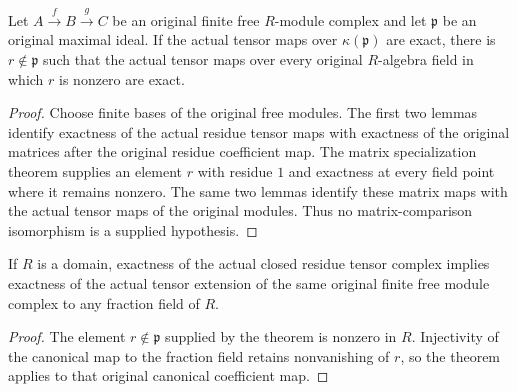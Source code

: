 \begin{theorem}
\label{thm:kn-specialization-original-free-neighborhood}
\leanok
{}
Let $A\xrightarrow f B\xrightarrow g C$ be an original finite free
$R$-module complex and let $\mathfrak p$ be an original maximal
ideal.  If the actual tensor maps over $\kappa(\mathfrak p)$ are
exact, there is $r\notin\mathfrak p$ such that the actual tensor
maps over every original $R$-algebra field in which $r$ is nonzero
are exact.
\end{theorem}
\begin{proof}
Choose finite bases of the original free modules.  The first two
lemmas identify exactness of the actual residue tensor maps with
exactness of the original matrices after the original residue
coefficient map.  The matrix specialization theorem supplies an
element $r$ with residue $1$ and exactness at every field point
where it remains nonzero.  The same two lemmas identify these matrix
maps with the actual tensor maps of the original modules.  Thus no
matrix-comparison isomorphism is a supplied hypothesis.
\end{proof}

\begin{corollary}
\label{cor:kn-specialization-original-free-generic}
\leanok
{}
If $R$ is a domain, exactness of the actual closed residue tensor
complex implies exactness of the actual tensor extension of the
same original finite free module complex to any fraction field of $R$.
\end{corollary}
\begin{proof}
The element $r\notin\mathfrak p$ supplied by the theorem is
nonzero in $R$.  Injectivity of the canonical map to the fraction
field retains nonvanishing of $r$, so the theorem applies to that
original canonical coefficient map.
\end{proof}

